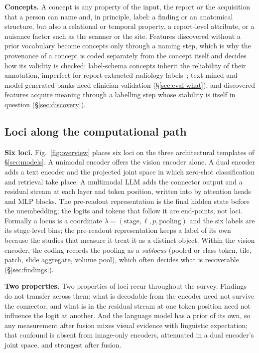 \textbf{Concepts.} A concept is any property of the input, the report or the acquisition that a person can
name and, in principle, label: a finding or an anatomical structure, but also a relational or temporal
property, a report-level attribute, or a nuisance factor such as the scanner or the site. Features
discovered without a prior vocabulary become concepts only through a naming step, which is why the
provenance of a concept is coded separately from the concept itself and decides how its validity is
checked: label-schema concepts inherit the reliability of their annotation, imperfect for
report-extracted radiology labels~\cite{irvin2019chexpert,smit2020chexbert}; text-mined and
model-generated banks need clinician validation (\S\ref{sec:eval-what}); and discovered features
acquire meaning through a labelling step whose stability is itself in question (\S\ref{sec:discovery}).

\subsection{Loci along the computational path}
\label{sec:loci}

\textbf{Six loci.} Fig.~\ref{fig:overview} places six loci on the three architectural templates of \S\ref{sec:models}. A
unimodal encoder offers the vision encoder alone. A dual encoder adds a text encoder and the projected
joint space in which zero-shot classification and retrieval take place. A multimodal LLM adds the
connector output and a residual stream at each layer and token position, written into by attention heads
and MLP blocks. The pre-readout representation is the final hidden state before the unembedding; the
logits and tokens that follow it are end-points, not loci. Formally a locus is a coordinate
$\lambda=(\text{stage},\ell,p,\text{pooling})$ and the six labels are its stage-level bins; the
pre-readout representation keeps a label of its own because the studies that measure it treat it as a
distinct object. Within the vision encoder, the coding records the pooling as a \emph{sublocus} (pooled
or class token, tile, patch, slide aggregate, volume pool), which often decides what is recoverable
(\S\ref{sec:findings}).

\textbf{Two properties.} Two properties of loci recur throughout the survey. Findings do not transfer across them: what is
decodable from the encoder need not survive the connector, and what is in the residual stream at one
token position need not influence the logit at another. And the language model has a prior of its own,
so any measurement after fusion mixes visual evidence with linguistic expectation; that confound is
absent from image-only encoders, attenuated in a dual encoder's joint space, and strongest after fusion.


